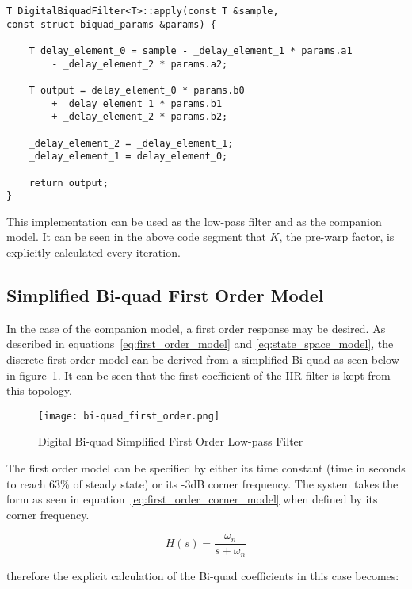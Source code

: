 \begin{lstlisting}
T DigitalBiquadFilter<T>::apply(const T &sample, 
const struct biquad_params &params) {
    
    T delay_element_0 = sample - _delay_element_1 * params.a1 
	    - _delay_element_2 * params.a2;
    
    T output = delay_element_0 * params.b0 
	    + _delay_element_1 * params.b1 
	    + _delay_element_2 * params.b2;

    _delay_element_2 = _delay_element_1;
    _delay_element_1 = delay_element_0;

    return output;
}

\end{lstlisting}

This implementation can be used as the \Lone low-pass filter and as the companion model.  It can be seen in the above code segment that $K$, the pre-warp factor, is explicitly calculated every iteration.

\subsection{Simplified Bi-quad First Order Model}

In the case of the companion model, a first order response may be desired.  As described in equations~\ref{eq:first_order_model} and \ref{eq:state_space_model}, the discrete first order model can be derived from a simplified Bi-quad as seen below in figure~\ref{fig:bi-quad_first_order}.  It can be seen that the first coefficient of the \ac{IIR} filter is kept from this topology.
\begin{figure}[h!]
 \centering
  \texttt{[image: bi-quad\_first\_order.png]}
  \caption{Digital Bi-quad Simplified First Order Low-pass Filter }
  \label{fig:bi-quad_first_order}
\end{figure}

The first order model can be specified by either its time constant (time in seconds to reach 63\% of steady state) or its -3dB corner frequency.  The system takes the form as seen in equation~\ref{eq:first_order_corner_model} when defined by its corner frequency.

\begin{equation}\label{eq:first_order_corner_model}
H(s)=\frac{\omega_n}{s+\omega_n}
\end{equation}

therefore the explicit calculation of the Bi-quad coefficients in this case becomes:

